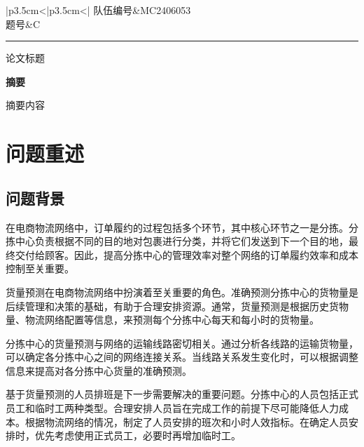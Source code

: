\documentclass[UTF8,a4paper,10 pt]{article}%
\begin{document}
	\setlength{\lineskip}{8pt}
	\setlength{\lineskiplimit}{8pt}
    
\begin{table}[!ht]
    \renewcommand\arraystretch{1.5}
    \centering  
    \begin{tabular}{|p{3.5cm}<{\centering}|p{3.5cm}<{\centering}|}
        \hline
        {队伍编号}&MC2406053\\
        \hline
        题号&C\\
        \hline        
    \end{tabular}
\end{table}

\setcounter{page}{1}

\noindent\rule{\linewidth}{1pt}
\begin{center}
    \Large 论文标题
\end{center}
\begin{center}
    \large\bf 摘要
\end{center}

摘要内容



\newpage

\tableofcontents


\newpage
\setcounter{page}{1}


\section{问题重述}
\subsection{问题背景}
在电商物流网络中，订单履约的过程包括多个环节，其中核心环节之一是分拣。分拣中心负责根据不同的目的地对包裹进行分类，并将它们发送到下一个目的地，最终交付给顾客。因此，提高分拣中心的管理效率对整个网络的订单履约效率和成本控制至关重要。

货量预测在电商物流网络中扮演着至关重要的角色。准确预测分拣中心的货物量是后续管理和决策的基础，有助于合理安排资源。通常，货量预测是根据历史货物量、物流网络配置等信息，来预测每个分拣中心每天和每小时的货物量。

分拣中心的货量预测与网络的运输线路密切相关。通过分析各线路的运输货物量，可以确定各分拣中心之间的网络连接关系。当线路关系发生变化时，可以根据调整信息来提高对各分拣中心货量的准确预测。

基于货量预测的人员排班是下一步需要解决的重要问题。分拣中心的人员包括正式员工和临时工两种类型。合理安排人员旨在完成工作的前提下尽可能降低人力成本。根据物流网络的情况，制定了人员安排的班次和小时人效指标。在确定人员安排时，优先考虑使用正式员工，必要时再增加临时工。
\end{document}
